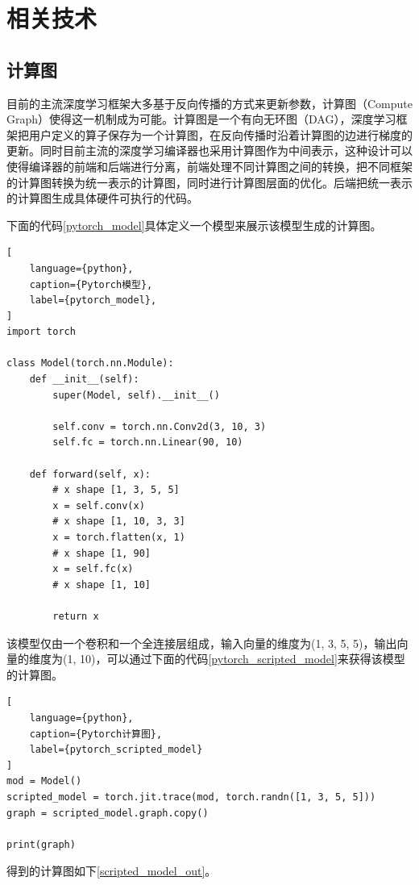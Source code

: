 \chapter{相关技术}


\section{计算图}

目前的主流深度学习框架大多基于反向传播的方式来更新参数，计算图（Compute Graph）使得这一机制成为可能。计算图是一个有向无环图（DAG），深度学习框架把用户定义的算子保存为一个计算图，在反向传播时沿着计算图的边进行梯度的更新。同时目前主流的深度学习编译器也采用计算图作为中间表示，这种设计可以使得编译器的前端和后端进行分离，前端处理不同计算图之间的转换，把不同框架的计算图转换为统一表示的计算图，同时进行计算图层面的优化。后端把统一表示的计算图生成具体硬件可执行的代码。

下面的代码\ref{pytorch_model}具体定义一个模型来展示该模型生成的计算图。

\begin{lstlisting}[
    language={python},
    caption={Pytorch模型},
    label={pytorch_model},
]
import torch

class Model(torch.nn.Module):
    def __init__(self):
        super(Model, self).__init__()

        self.conv = torch.nn.Conv2d(3, 10, 3)
        self.fc = torch.nn.Linear(90, 10)

    def forward(self, x):
        # x shape [1, 3, 5, 5]
        x = self.conv(x)
        # x shape [1, 10, 3, 3]
        x = torch.flatten(x, 1)
        # x shape [1, 90]
        x = self.fc(x)
        # x shape [1, 10]

        return x
\end{lstlisting}

该模型仅由一个卷积和一个全连接层组成，输入向量的维度为(1, 3, 5, 5)，输出向量的维度为(1, 10)，可以通过下面的代码\ref{pytorch_scripted_model}来获得该模型的计算图。

\begin{lstlisting}[
    language={python},
    caption={Pytorch计算图},
    label={pytorch_scripted_model}
]
mod = Model()
scripted_model = torch.jit.trace(mod, torch.randn([1, 3, 5, 5]))
graph = scripted_model.graph.copy()

print(graph)
\end{lstlisting}

得到的计算图如下\ref{scripted_model_out}。


